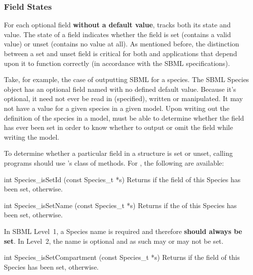 \documentclass{sbmlmanual}
\begin{document}
\subsubsection{Field States}
\label{sec:field-states}

For each optional field \textbf{without a default value}, \libsbml{} tracks
both its state and value.  The state of a field indicates whether the field
is set (contains a valid value) or unset (contains no value at all).  As
mentioned before, the distinction between a set and unset field is critical
for both \libsbml{} and applications that depend upon it to function
correctly (in accordance with the SBML specifications).

Take, for example, the case of outputting SBML for a species.  The SBML
Species object has an optional field named  with no defined
default value.  Because it's optional, it need not ever be read in
(specified), written or manipulated.  It may not have a value for a given
species in a given model.  Upon writing out the definition of the species
in a model, \libsbml{} must be able to determine whether the field has ever
been set in order to know whether to output or omit the field while writing
the model.

To determine whether a particular field in a structure is set or unset,
calling programs should use \libsbml{}'s  class of
methods.  For , the following are available:


\begin{methoddef}{int Species\_isSetId (const Species\_t *s)}
  Returns  if the  field of this Species has been set,
   otherwise.
\end{methoddef}


\begin{methoddef}{int Species\_isSetName (const Species\_t *s)}
  Returns  if the  of this Species has been set,
   otherwise.
 
  In SBML Level~1, a Species name is required and therefore \textbf{should
    always be set}.  In Level~2, the name is optional and as such may or
  may not be set.
\end{methoddef}


\begin{methoddef}{int Species\_isSetCompartment (const Species\_t *s)}
  Returns  if the  field of this Species has
  been set,  otherwise.
\end{methoddef}
\end{document}
